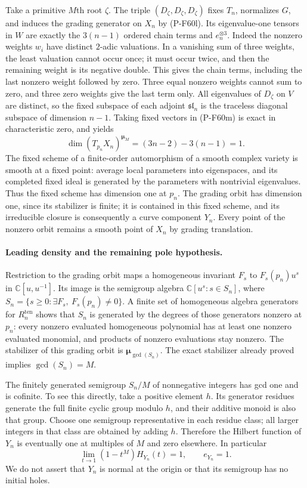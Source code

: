 Take a primitive $M$th root $\zeta$.
The triple $(D_\zeta,D_\zeta,D_\zeta)$ fixes $T_n$,
normalizes $G$, and induces the grading generator
on $X_n$ by (P-F60l).  Its eigenvalue-one tensors in
$W$ are exactly the $3(n-1)$ ordered chain terms and
$e_n^{\otimes3}$.  Indeed the nonzero weights $w_i$
have distinct $2$-adic valuations.  In a vanishing
sum of three weights, the least valuation cannot occur
once; it must occur twice, and then the remaining
weight is its negative double.  This gives the chain
terms, including the last nonzero weight followed by
zero.  Three equal nonzero weights cannot sum to zero,
and three zero weights give the last term only.
All eigenvalues of $D_\zeta$ on $V$ are distinct, so
the fixed subspace of each adjoint $\mathfrak{sl}_n$
is the traceless diagonal subspace of dimension $n-1$.
Taking fixed vectors in (P-F60m) is exact in
characteristic zero, and yields
\[
           \dim(T_{p_n}X_n)^{\boldsymbol\mu_M}
                        =(3n-2)-3(n-1)=1.              \tag{P-F60n}
\]
The fixed scheme of a finite-order automorphism of a
smooth complex variety is smooth at a fixed point:
average local parameters into eigenspaces, and its
completed fixed ideal is generated by the parameters
with nontrivial eigenvalues.  Thus the fixed scheme
has dimension one at $p_n$.  The grading orbit has
dimension one, since its stabilizer is finite; it is
contained in this fixed scheme, and its irreducible
closure is consequently a curve component $Y_n$.
Every point of the nonzero orbit remains a smooth
point of $X_n$ by grading translation.

\paragraph{Leading density and the remaining pole hypothesis.}
Restriction to the grading orbit maps a homogeneous
invariant $F_s$ to $F_s(p_n)u^s$ in
$\mathbb C[u,u^{-1}]$.  Its image is the semigroup
algebra $\mathbb C[u^s:s\in S_n]$, where
$S_n=\{s\ge0:\exists F_s,\ F_s(p_n)\ne0\}$.
A finite set of homogeneous algebra generators for
$R^{\mathrm{ten}}_n$ shows that $S_n$ is generated by
the degrees of those generators nonzero at $p_n$:
every nonzero evaluated homogeneous polynomial has
at least one nonzero evaluated monomial, and products
of nonzero evaluations stay nonzero.  The stabilizer
of this grading orbit is $\boldsymbol\mu_{\gcd(S_n)}$.
The exact stabilizer already proved implies
$\gcd(S_n)=M$.

The finitely generated semigroup $S_n/M$ of
nonnegative integers has gcd one and is cofinite.
To see this directly, take a positive element $h$.
Its generator residues generate the full finite cyclic
group modulo $h$, and their additive monoid is also
that group.  Choose one semigroup representative in
each residue class; all larger integers in that class
are obtained by adding $h$.  Therefore the Hilbert
function of $Y_n$ is eventually one at multiples of
$M$ and zero elsewhere.  In particular
\[
              \lim_{t\to1}(1-t^M)H_{Y_n}(t)=1,
                           \qquad e_{Y_n}=1.            \tag{P-F60o}
\]
We do not assert that $Y_n$ is normal at the origin
or that its semigroup has no initial holes.

